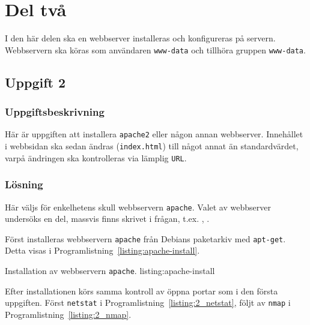 %
%
%


\section{Del två}
I den här delen ska en webbserver installeras och konfigureras på servern.
Webbservern ska köras som användaren \texttt{www-data} och tillhöra gruppen
\texttt{www-data}.


\subsection{Uppgift 2}
\subsubsection{Uppgiftsbeskrivning}
Här är uppgiften att installera \texttt{apache2} eller någon annan webbserver.
Innehållet i webbsidan ska sedan ändras (\texttt{index.html}) till något annat
än standardvärdet, varpå ändringen ska kontrolleras via lämplig \texttt{URL}.


\subsubsection{Lösning}
Här väljs för enkelhetens skull webbservern \texttt{apache}.
Valet av webbserver undersöks en del, massvis finns skrivet i frågan, t.ex.
\cite{webserver:compar1}, \cite{webserver:compar2}.

Först installeras webbservern \texttt{apache} från Debians paketarkiv med
\texttt{apt-get}.
Detta visas i Programlistning~\ref{listing:apache-install}.

            {Installation av webbservern \texttt{apache}.}
            {listing:apache-install}


Efter installationen körs samma kontroll av öppna portar som i den första
uppgiften.  Först \texttt{netstat} i Programlistning~\ref{listing:2_netstat},
följt av \texttt{nmap} i Programlistning~\ref{listing:2_nmap}.

